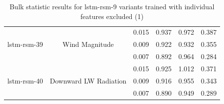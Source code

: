 \begin{table}[H]
\begin{tabular}{c|c|c|c|c|c }
\multirow{3}{6em}{lstm-rsm-39} & \multirow{3}{8em}{Wind Magnitude} & 0.015 & 0.937 & 0.972 & 0.387 \\ & & 0.009 & 0.922 & 0.932 & 0.355 \\ & & 0.007 & 0.892 & 0.964 & 0.284 \\
\hline
\multirow{3}{6em}{lstm-rsm-40} & \multirow{3}{8em}{Downward LW Radiation} & 0.015 & 0.925 & 1.012 & 0.371 \\ & & 0.009 & 0.916 & 0.955 & 0.343 \\ & & 0.007 & 0.890 & 0.949 & 0.289 \\
\end{tabular}
    \caption{Bulk statistic results for lstm-rsm-9 variants trained with individual features excluded (1)}
    \label{feat-variants-table-1}
\end{table}


